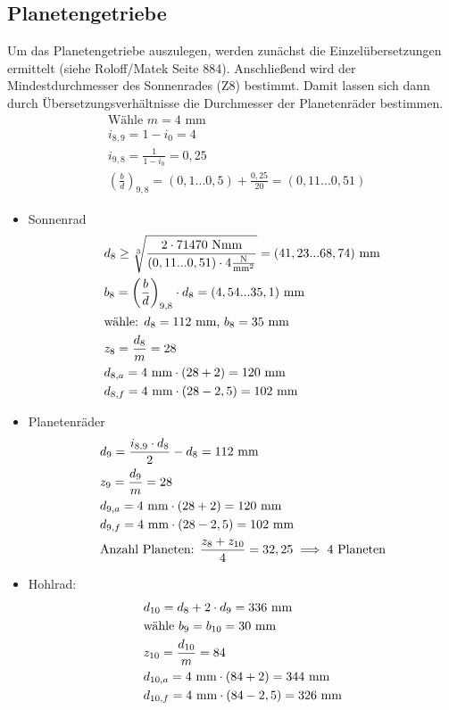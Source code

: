 \subsection{Planetengetriebe}
Um das Planetengetriebe auszulegen, werden zunächst die Einzelübersetzungen ermittelt (siehe Roloff/Matek Seite 884). Anschließend wird der Mindestdurchmesser des Sonnenrades (Z8) bestimmt. Damit lassen sich dann durch Übersetzungsverhältnisse die Durchmesser der Planetenräder bestimmen.
\begin{align*}
	&\text{Wähle } m=4  \text{ mm} \\
	&i_{8,9} = 1 - i_0 = 4 \\
	&i_{9,8} = \frac{1}{1-i_0}  = 0,25 \\
	& \left(\frac{b}{d} \right) _{9,8} = (0,1...0,5) + \frac{0,25}{20}  =  (0,11...0,51) 
\end{align*}
\begin{itemize}
\item Sonnenrad
\begin{align*}
	&d_8 \ge \sqrt[3]{\frac{2 \cdot 71470 \text{ Nmm}}{(0,11...0,51) \cdot  4 \frac{\text{N}}{\text{mm}^2}}}= (41,23...68,74) \text{ mm}\\
	&b_8= \left(\frac{b}{d} \right) _{9,8}  \cdot d_8 = (4,54...35,1) \text{ mm}  \\
	&\text{wähle: } d_8 = 112 \text{ mm, } b_8 = 35 \text{ mm}  \\
	&z_8 = \frac{d_8}{m} = 28 \\
	&d_{8,a} = 4\text{ mm} \cdot (28+2) =120\text{ mm} \\
	&d_{8,f} = 4\text{ mm} \cdot (28-2,5) =102\text{ mm} 
\end{align*}
\item Planetenräder 
\begin{align*}
	&d_9 = \frac{i_{8,9} \cdot d_8}{2 } - d_8 = 112 \text{ mm}  \\
	&z_9 = \frac{d_9}{m} = 28 \\
	&d_{9,a} = 4\text{ mm} \cdot (28+2) =120\text{ mm} \\
	&d_{9,f} = 4\text{ mm} \cdot (28-2,5) =102\text{ mm} \\ 
	&\text{Anzahl Planeten: } \frac{z_{8} + z_{10}}{4} = 32,25 \implies 4 \text{ Planeten} 
\end{align*}	
\item Hohlrad:
\begin{align*}
	&d_{10} = d_8 + 2\cdot d_9 = 336 \text{ mm}  \\
	&\text{wähle } b_9 = b_{10} = 30 \text{ mm}  \\
	&z_{10}  = \frac{d_{10}}{m} = 84 \\
	&d_{10,a} = 4\text{ mm} \cdot (84+2) =344\text{ mm} \\
	&d_{10,f} = 4\text{ mm} \cdot (84-2,5) =326\text{ mm} 
\end{align*}	
\end{itemize}

